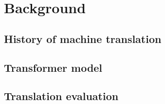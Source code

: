 \chapter{Background}

\section{History of machine translation}

\section{Transformer model}

\section{Translation evaluation}
